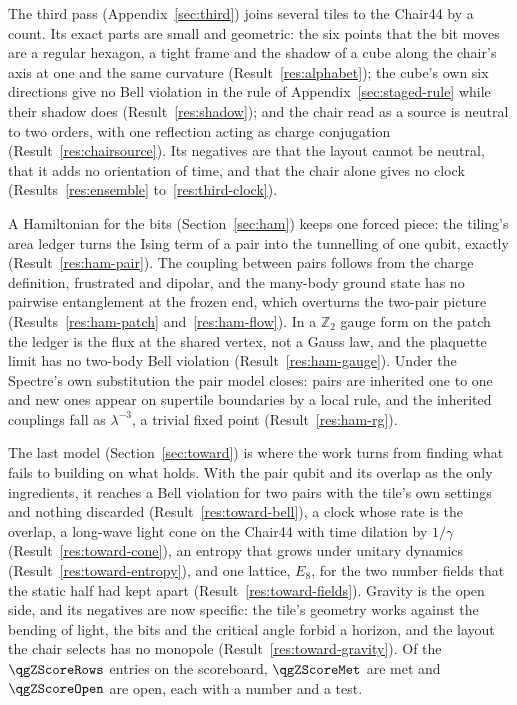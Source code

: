 \documentclass[11pt]{article}
\theoremstyle{definition}
\begin{document}
The third pass (Appendix~\ref{sec:third}) joins several tiles to the Chair44 by a count. Its exact parts are small and geometric: the six points that the bit moves are a regular hexagon, a tight frame and the shadow of a cube along the chair's axis at one and the same curvature (Result~\ref{res:alphabet}); the cube's own six directions give no Bell violation in the rule of Appendix~\ref{sec:staged-rule} while their shadow does (Result~\ref{res:shadow}); and the chair read as a source is neutral to two orders, with one reflection acting as charge conjugation (Result~\ref{res:chairsource}). Its negatives are that the layout cannot be neutral, that it adds no orientation of time, and that the chair alone gives no clock (Results~\ref{res:ensemble} to~\ref{res:third-clock}).

A Hamiltonian for the bits (Section~\ref{sec:ham}) keeps one forced piece: the tiling's area ledger turns the Ising term of a pair into the tunnelling of one qubit, exactly (Result~\ref{res:ham-pair}). The coupling between pairs follows from the charge definition, frustrated and dipolar, and the many-body ground state has no pairwise entanglement at the frozen end, which overturns the two-pair picture (Results~\ref{res:ham-patch} and~\ref{res:ham-flow}). In a $\mathbb{Z}_2$ gauge form on the patch the ledger is the flux at the shared vertex, not a Gauss law, and the plaquette limit has no two-body Bell violation (Result~\ref{res:ham-gauge}). Under the Spectre's own substitution the pair model closes: pairs are inherited one to one and new ones appear on supertile boundaries by a local rule, and the inherited couplings fall as $\lambda^{-3}$, a trivial fixed point (Result~\ref{res:ham-rg}).

The last model (Section~\ref{sec:toward}) is where the work turns from finding what fails to building on what holds. With the pair qubit and its overlap as the only ingredients, it reaches a Bell violation for two pairs with the tile's own settings and nothing discarded (Result~\ref{res:toward-bell}), a clock whose rate is the overlap, a long-wave light cone on the Chair44 with time dilation by $1/\gamma$ (Result~\ref{res:toward-cone}), an entropy that grows under unitary dynamics (Result~\ref{res:toward-entropy}), and one lattice, $E_8$, for the two number fields that the static half had kept apart (Result~\ref{res:toward-fields}). Gravity is the open side, and its negatives are now specific: the tile's geometry works against the bending of light, the bits and the critical angle forbid a horizon, and the layout the chair selects has no monopole (Result~\ref{res:toward-gravity}). Of the $\qgZScoreRows$ entries on the scoreboard, $\qgZScoreMet$ are met and $\qgZScoreOpen$ are open, each with a number and a test.
\end{document}
